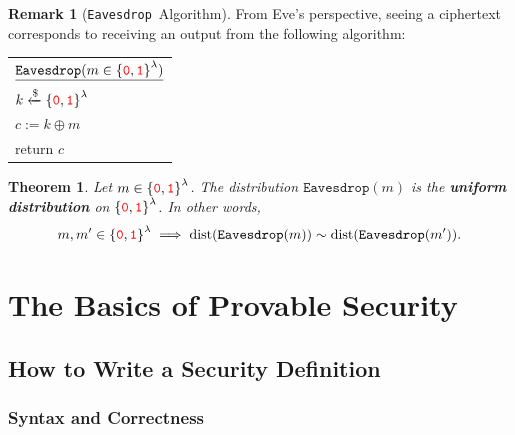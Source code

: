 \documentclass[12pt,openany]{book}
\newtheorem{theorem}{Theorem}[chapter]
\theoremstyle{definition}
\newtheorem{remark}{Remark}[chapter]
\newcommand{\zero}{\textcolor{red}{\texttt{0}}}
\newcommand{\one}{\textcolor{red}{\texttt{1}}}
\newcommand{\tab}{\hspace{12pt}}
\newcommand{\xor}{\oplus}
\newcommand{\randomness}{\$}
\newcommand{\uniform}{\xleftarrow{\randomness}}
\newcommand{\binaryfield}{\set{\zero,\one}}
\newcommand{\eavesdrop}{\texttt{Eavesdrop}}
\begin{document}
	\newpage
	\begin{remark}[\eavesdrop\ Algorithm]
		From Eve’s perspective, seeing a ciphertext corresponds to receiving
		an output from the following algorithm: \\ \begin{center}
		\begin{tabular}{|l|}
			\hline
			\(\underline{\eavesdrop(m\in\binaryfield^\lambda)}\)\\
			\tab\(k\uniform\binaryfield^\lambda\)\\
			\tab\(c:=k\xor m\)\\
			\tab return \(c\)\\
			\hline
		\end{tabular}
		\end{center}
	\end{remark}

	\begin{tcolorbox}[colback=white,colframe=thmcolor,arc=5pt,title={\color{white}\bf }]
		\begin{theorem}
			Let \(m\in\binaryfield^\lambda\). The distribution \(\eavesdrop(m)\) is the \textbf{uniform distribution} on \(\binaryfield^\lambda\). In other words, \[
			m,m'\in\binaryfield^\lambda\implies\textnormal{dist}(\eavesdrop(m))\sim\textnormal{dist}(\eavesdrop(m')).
			\]
		\end{theorem}
	\end{tcolorbox}
	
	\chapter{The Basics of Provable Security}
	
	\section{How to Write a Security Definition}
	\subsection{Syntax and Correctness}
	
\end{document}
